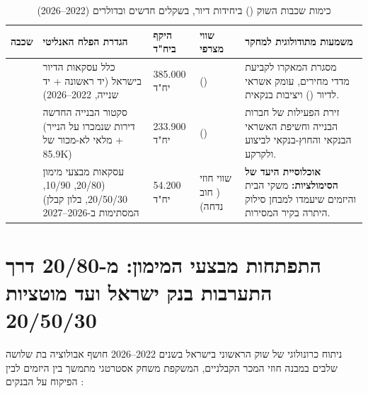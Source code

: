 \begin{table}[htbp]
\caption{כימות שכבות השוק () ביחידות דיור, בשקלים חדשים ובדולרים (\num{2022}--\num{2026}) \cite{cbs2026dwellings,boi2025stability,mof2025economist}}
\label{tab:tam_sam_som}
\centering
\small
\renewcommand{\arraystretch}{1.28}
\begin{tabularx}{\textwidth}{R{1.8cm} R{3.2cm} R{2.2cm} R{2.3cm} Y}
\toprule
{}
\textbf{שכבה} & \textbf{הגדרת הפלח האנליטי} & \textbf{היקף ביח"ד} & \textbf{שווי מצרפי} & \textbf{משמעות מתודולוגית למחקר} \\
\midrule
\textbf{} & כלל עסקאות הדיור בישראל (יד ראשונה + יד שנייה, \num{2022}--\num{2026}) & \num{385,000} יח"ד &  () & מסגרת המאקרו לקביעת מדדי מחירים, עומק אשראי לדיור () ויציבות בנקאית. \\
\textbf{} & סקטור הבנייה החדשה (דירות שנמכרו על הנייר + מלאי לא-מכור של \num{85.9K}) & \num{233,900} יח"ד &  () & זירת הפעילות של חברות הבנייה וחשיפת האשראי הבנקאי והחוץ-בנקאי לביצוע ולקרקע. \\
\textbf{} & עסקאות מבצעי מימון (\num{20/80}, \num{10/90}, \num{20/50/30}, בלון קבלן) המסתימות ב-\num{2026}--\num{2027} & \num{54,200} יח"ד &  שווי חוזי ( חוב נדחה) & \textbf{אוכלוסיית היעד של הסימולציות:} משקי הבית והיזמים שיעמדו למבחן סילוק היתרה בקיר המסירות. \\
\bottomrule
\end{tabularx}
\end{table}

\section{התפתחות מבצעי המימון: מ-\num{20/80} דרך התערבות בנק ישראל ועד מוטציות \num{20/50/30}}
\label{sec:promotions_evolution}

ניתוח כרונולוגי של שוק הראשוני בישראל בשנים \num{2022}--\num{2026} חושף אבולוציה בת שלושה שלבים במבנה חוזי המכר הקבלניים, המשקפת משחק אסטרטגי מתמשך בין היזמים לבין הפיקוח על הבנקים \cite{boi2025stability,boi2025directive,mof2025economist}:

